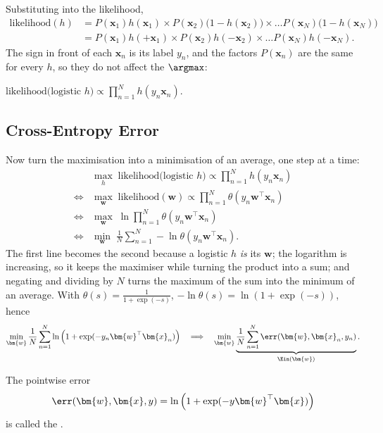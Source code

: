 Substituting into the likelihood,
\begin{align*}
    \text{likelihood}(h)
    &= P(\bm{x}_1) h(\bm{x}_1) \times P(\bm{x}_2) \bigl( 1 - h(\bm{x}_2)
    \bigr) \times \dots P(\bm{x}_N) \bigl( 1 - h(\bm{x}_N) \bigr)\\
    &= P(\bm{x}_1) h(+\bm{x}_1) \times P(\bm{x}_2) h(-\bm{x}_2) \times
    \dots P(\bm{x}_N) h(-\bm{x}_N) .
\end{align*}
The sign in front of each \(\bm{x}_n\) is its label \(y_n\), and the factors
\(P(\bm{x}_n)\) are the same for every \(h\), so they do not affect the
\(\argmax\):

\begin{moral}
    \(\displaystyle \text{likelihood(logistic } h) \propto \prod_{n=1}^N
    h(y_n \bm{x}_n)\).
\end{moral}

\subsection{Cross-Entropy Error}

Now turn the maximisation into a minimisation of an average, one step at a
time:
\begin{align*}
    &\max_h \; \text{likelihood(logistic } h) \propto \prod_{n=1}^N h(y_n
    \bm{x}_n)\\
    \iff{} &\max_{\bm{w}} \; \text{likelihood}(\bm{w}) \propto \prod_{n=1}^N
    \theta \left( y_n \bm{w}^\top \bm{x}_n \right)\\
    \iff{} &\max_{\bm{w}} \; \ln \prod_{n=1}^N \theta \left( y_n \bm{w}^\top
    \bm{x}_n \right)\\
    \iff{} &\min_{\bm{w}} \; \frac{1}{N} \sum_{n=1}^N - \ln \theta \left( y_n
    \bm{w}^\top \bm{x}_n \right) .
\end{align*}
The first line becomes the second because a logistic \(h\) \emph{is} its
\(\bm{w}\); the logarithm is increasing, so it keeps the maximiser while
turning the product into a sum; and negating and dividing by \(N\) turns the
maximum of the sum into the minimum of an average. With \(\theta(s) = \frac{1}{1
+ \exp(-s)}\), \(-\ln \theta(s) = \ln(1 + \exp(-s))\), hence
\[
    \min_{\bm{w}} \frac{1}{N} \sum_{n=1}^N \ln \left( 1 + \exp(-y_n
    \bm{w}^\top \bm{x}_n) \right)
    \quad \Longrightarrow \quad
    \min_{\bm{w}} \underbrace{\frac{1}{N} \sum_{n=1}^N \err(\bm{w}, \bm{x}_n,
    y_n)}_{\Ein(\bm{w})} .
\]

\begin{definition}\label{def:ce-err}
    The pointwise error
    \begin{equation}\label{eq:ce-err}
        \err(\bm{w}, \bm{x}, y) = \ln \left( 1 + \exp(-y \bm{w}^\top \bm{x})
        \right)
    \end{equation}
    is called the .
\end{definition}

